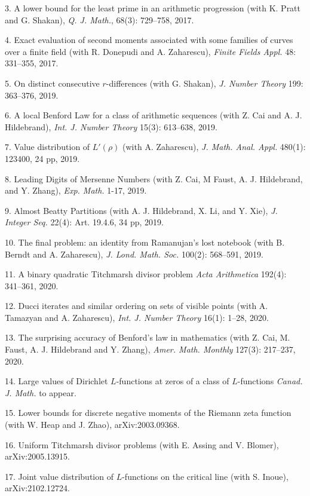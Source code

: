 \documentclass[margin,line,pifont,palatino,courier]{res}
\begin{document}
\begin{resume}
3. {A lower bound for the least prime in an arithmetic progression} (with K. Pratt and G. Shakan), {\it Q. J. Math.}, 68(3): 729--758,
2017.

4. {Exact evaluation of second moments associated with some families of
	curves over a finite field} (with R. Donepudi and A. Zaharescu), {\it Finite Fields Appl.} 48: 331--355, 2017.
	
5. {On distinct consecutive $r$-differences} (with G. Shakan), {\it J. Number Theory} 199: 363--376, 2019.

6. {A local Benford Law for a class of arithmetic sequences} (with Z. Cai and A. J. Hildebrand), {\it Int. J. Number Theory} 15(3): 613--638, 2019.
  
7. {Value distribution of $L'(\rho)$} (with A. Zaharescu), {{\it J. Math. Anal. Appl.} 480(1): 123400, 24 pp, 2019.}

8. {Leading Digits of Mersenne Numbers} (with Z. Cai, M Faust, A. J. Hildebrand, and Y. Zhang), {\it Exp. Math.} 1-17, 2019.  %

9. {Almost Beatty Partitions} (with A. J. Hildebrand, X. Li, and Y. Xie), {{\it J. Integer Seq.} 22(4): Art. 19.4.6, 34 pp, 2019.}
 
 10. {The final problem: an identity from Ramanujan's lost notebook} (with B. Berndt and A. Zaharescu), {\it J. Lond. Math. Soc.} 100(2): 568--591, 2019.

11. {A binary quadratic Titchmarsh divisor problem}
{\it Acta Arithmetica} 192(4): 341--361, 2020. %

12. {Ducci iterates and similar ordering on sets of visible points} (with A. Tamazyan and A. Zaharescu), {{\it Int. J. Number Theory} 16(1): 1--28, 2020.}
 
 13. {The surprising accuracy of Benford's law in mathematics} (with Z. Cai, M. Faust, A. J. Hildebrand and Y. Zhang), {\it Amer. Math. Monthly}  127(3): 217--237, 2020. 
 
14. {Large values of Dirichlet $L$-functions at zeros of a class of $L$-functions} {\it Canad. J. Math.} to appear.

15. {Lower bounds for discrete negative moments of the Riemann zeta function (with W. Heap and J. Zhao)}, arXiv:2003.09368.

16. {Uniform Titchmarsh divisor problems} (with E. Assing and V. Blomer), arXiv:2005.13915. 

17. {Joint value distribution of $L$-functions on the critical line} (with S. Inoue), arXiv:2102.12724.


\end{resume}
\end{document}
